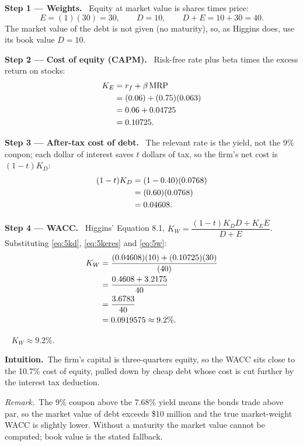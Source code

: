 \documentclass[11pt,a4paper]{article}
\numberwithin{equation}{section}
\newcommand{\step}[2]{\par\medskip\noindent\textbf{Step #1 --- #2.}~}
\newcommand{\intuition}[1]{\par\medskip\noindent\textbf{Intuition.}~#1}
\newcommand{\remark}[1]{\par\smallskip\noindent\textit{Remark.}~#1}
\newcommand{\answer}[1]{\par\smallskip\noindent\fbox{\textbf{Answer #1.}}~}
\begin{document}
\step{1}{Weights} Equity at market value is shares times price:
\begin{equation}\label{eq:5w}
  E=(1)(30)=30, \qquad D=10, \qquad D+E=10+30=40.
\end{equation}
The market value of the debt is not given (no maturity), so, as Higgins does, use its book value $D=10$.

\step{2}{Cost of equity (CAPM)} Risk-free rate plus beta times the excess return on stocks:
\begin{align}
  K_E &= r_f + \beta\,\mathrm{MRP} \label{eq:5ke}\\
      &= (0.06) + (0.75)(0.063) \notag\\
      &= 0.06 + 0.04725 \notag\\
      &= 0.10725. \label{eq:5keres}
\end{align}

\step{3}{After-tax cost of debt} The relevant rate is the yield, not the 9\% coupon; each dollar
of interest saves $t$ dollars of tax, so the firm's net cost is $(1-t)K_D$:
\begin{align}
  (1-t)K_D &= (1-0.40)(0.0768) \notag\\
           &= (0.60)(0.0768) \notag\\
           &= 0.04608. \label{eq:5kd}
\end{align}

\step{4}{WACC} Higgins' Equation 8.1, $K_W = \dfrac{(1-t)K_D D + K_E E}{D+E}$. Substituting
\eqref{eq:5kd}, \eqref{eq:5keres} and \eqref{eq:5w}:
\begin{align}
  K_W &= \frac{(0.04608)(10) + (0.10725)(30)}{(40)} \notag\\
      &= \frac{0.4608 + 3.2175}{40} \notag\\
      &= \frac{3.6783}{40} \notag\\
      &= 0.0919575 \approx 9.2\%. \label{eq:5res}
\end{align}

\answer{(WACC)} $K_W\approx9.2\%$.

\intuition{The firm's capital is three-quarters equity, so the WACC sits close to the 10.7\% cost
of equity, pulled down by cheap debt whose cost is cut further by the interest tax deduction.}

\remark{The 9\% coupon above the 7.68\% yield means the bonds trade above par, so the market
value of debt exceeds \$10 million and the true market-weight WACC is slightly lower. Without a
maturity the market value cannot be computed; book value is the stated fallback.}
\end{document}
